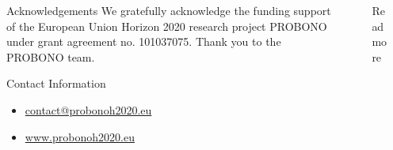 \documentclass[final]{beamer}
\newlength{\sepmargin}
\newlength{\sepwid}
\newlength{\onecolwid}
\begin{document}
      \begin{columns}[t] %
      
      \begin{column}{\sepmargin} \end{column}
        \begin{column}{\onecolwid} %
        \vspace{2.cm}
			\begin{block}{\large Acknowledgements}
                    We  gratefully  acknowledge  the  funding  support  of  the  European  Union Horizon 2020 research project PROBONO under grant agreement no.  101037075. Thank you to the PROBONO team.
				\end{block}	
                \vspace*{-0.9cm}
				\begin{alertblock}{\large Contact Information}
                \vspace*{-0.5cm}
					\begin{footnotesize}
					\begin{itemize}
						\item \href{mailto:luc.jonveaux@mottmac.com}{contact@probonoh2020.eu}
						\item \href{https://www.probonoh2020.eu/}{www.probonoh2020.eu}
					\end{itemize}
					\end{footnotesize}	
					
				\end{alertblock}
		    \end{column} %
			\begin{column}{\sepwid}\end{column} %
			\begin{column}{\onecolwid} %
             \vspace{2.cm}
              \begin{block}{\large Read more}
             

\end{block}
\end{column}
\end{columns}
\end{document}
